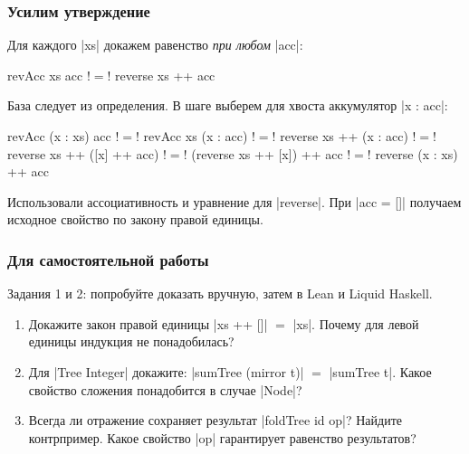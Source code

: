\documentclass[11pt]{beamer}
\begin{document}
\begin{frame}[fragile]
  \frametitle{Усилим утверждение}
  Для каждого \haskinline|xs| докажем равенство \emph{при любом} \haskinline|acc|:
  \begin{haskell}
    revAcc xs acc !$=$! reverse xs ++ acc
  \end{haskell}
  База следует из определения. В шаге выберем для хвоста аккумулятор \haskinline|x : acc|: \pause
  \begin{haskellsmall}
      revAcc (x : xs) acc
    !$=$! revAcc xs (x : acc)
    !$=$! reverse xs ++ (x : acc)
    !$=$! reverse xs ++ ([x] ++ acc)
    !$=$! (reverse xs ++ [x]) ++ acc
    !$=$! reverse (x : xs) ++ acc
  \end{haskellsmall}
  Использовали ассоциативность и уравнение для \haskinline|reverse|. При \haskinline|acc = []| получаем исходное свойство по закону правой единицы.
\end{frame}

\begin{frame}[fragile]
  \frametitle{Для самостоятельной работы}
  Задания 1 и 2: попробуйте доказать вручную, затем в Lean и Liquid Haskell.
  \begin{enumerate}
    \item Докажите закон правой единицы \haskinline|xs ++ []| $=$ \haskinline|xs|. Почему для левой единицы индукция не понадобилась?
    \item Для \haskinline|Tree Integer| докажите: \haskinline|sumTree (mirror t)| $=$ \haskinline|sumTree t|. Какое свойство сложения понадобится в случае \haskinline|Node|?
    \item Всегда ли отражение сохраняет результат \haskinline|foldTree id op|? Найдите контрпример. Какое свойство \haskinline|op| гарантирует равенство результатов?
  \end{enumerate}
\end{frame}
\end{document}
